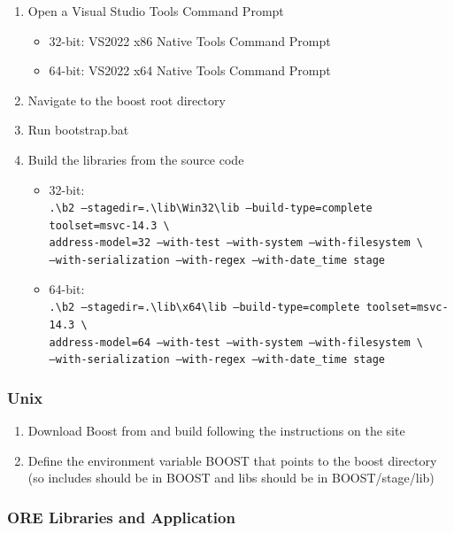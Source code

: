 \documentclass[12pt, a4paper]{article}
\newcommand{\bs}{\textbackslash}
\begin{document}
\begin{enumerate}
\item Open a Visual Studio Tools Command Prompt
\begin{itemize}
\item 32-bit: VS2022 x86 Native Tools Command Prompt
\item 64-bit: VS2022 x64 Native Tools Command Prompt
\end{itemize}
\item Navigate to the boost root directory
\item Run bootstrap.bat
\item Build the libraries from the source code
\begin{itemize}
\item 32-bit: \\
  {\footnotesize\tt .{\bs}b2 --stagedir=.{\bs}lib{\bs}Win32{\bs}lib --build-type=complete toolset=msvc-14.3 \bs \\
    address-model=32 --with-test --with-system --with-filesystem  \bs \\
    --with-serialization --with-regex --with-date\_time stage}
\item 64-bit: \\
  {\footnotesize\tt .{\bs}b2 --stagedir=.{\bs}lib{\bs}x64{\bs}lib --build-type=complete toolset=msvc-14.3 \bs \\
    address-model=64 --with-test --with-system --with-filesystem \bs \\
    --with-serialization --with-regex --with-date\_time stage}
\end{itemize}
\end{enumerate}

\subsubsection*{Unix}

\begin{enumerate}
\item Download Boost from \cite{boost} and build following the instructions on the site
\item Define the environment variable BOOST that points to the boost directory
(so includes should be in BOOST and libs should be in BOOST/stage/lib)
\end{enumerate}

\subsubsection{ORE Libraries and Application}\label{sec:build}
\end{document}
